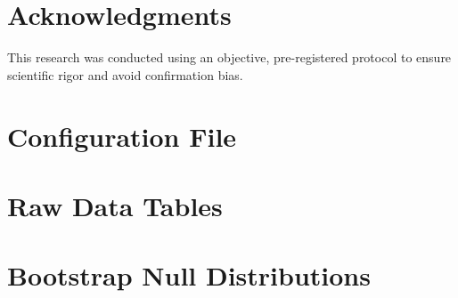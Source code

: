 \documentclass[11pt,a4paper]{article}
\begin{document}
\section*{Acknowledgments}

This research was conducted using an objective, pre-registered protocol to ensure scientific rigor and avoid confirmation bias.



\appendix

\section{Configuration File}
\label{app:config}


\section{Raw Data Tables}
\label{app:data}


\section{Bootstrap Null Distributions}
\label{app:bootstrap}

\end{document}
